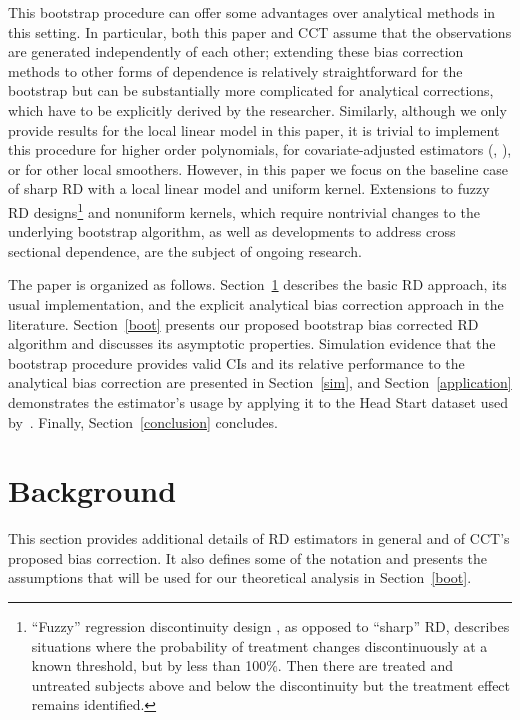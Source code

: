 \documentclass[12pt,fleqn]{article}
\begin{document}
This bootstrap procedure can offer some advantages over analytical methods in
this setting. In particular, both this paper and CCT assume that the
observations are generated independently of each other; extending these bias
correction methods to other forms of dependence is relatively straightforward
for the bootstrap but can be substantially more complicated for analytical
corrections, which have to be explicitly derived by the researcher. Similarly,
although we only provide results for the local linear model in this paper, it is
trivial to implement this procedure for higher order polynomials, for
covariate-adjusted estimators (\citealp{frolich2007}, \citealp{calonico2015}),
or for other local smoothers. \citep{loader2006} However, in this paper we focus
on the baseline case of sharp RD with a local linear model and uniform
kernel. Extensions to fuzzy RD designs\footnote{%
  ``Fuzzy'' regression discontinuity design \citep{HTV2001}, as opposed to
  ``sharp'' RD, describes situations where the probability of treatment changes
  discontinuously at a known threshold, but by less than 100\%. Then there are
  treated and untreated subjects above and below the discontinuity but the
  treatment effect remains identified.} %
and nonuniform kernels, which require nontrivial changes to the underlying
bootstrap algorithm, as well as developments to address cross sectional
dependence, are the subject of ongoing research.

The paper is organized as follows. Section~\ref{background} describes the basic
RD approach, its usual implementation, and the explicit analytical bias
correction approach in the literature. Section~\ref{boot} presents our proposed
bootstrap bias corrected RD algorithm and discusses its asymptotic
properties. Simulation evidence that the bootstrap procedure provides valid CIs
and its relative performance to the analytical bias correction are presented in
Section~\ref{sim}, and Section~\ref{application} demonstrates the estimator's
usage by applying it to the Head Start dataset used by~\cite{ludwig2007}.
Finally, Section~\ref{conclusion} concludes.

\section{Background}\label{background}

This section provides additional details of RD estimators in general and of
CCT's proposed bias correction. It also defines some of the notation and
presents the assumptions that will be used for our theoretical analysis in
Section~\ref{boot}.
\end{document}
